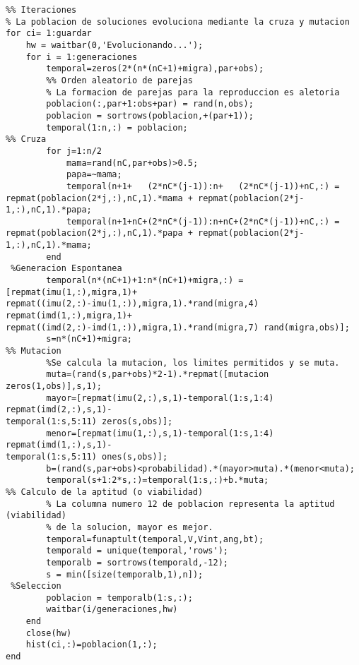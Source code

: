 \begin{verbatim}
%% Iteraciones
% La poblacion de soluciones evoluciona mediante la cruza y mutacion
for ci= 1:guardar
    hw = waitbar(0,'Evolucionando...');
    for i = 1:generaciones
        temporal=zeros(2*(n*(nC+1)+migra),par+obs);
        %% Orden aleatorio de parejas
        % La formacion de parejas para la reproduccion es aletoria
        poblacion(:,par+1:obs+par) = rand(n,obs);
        poblacion = sortrows(poblacion,+(par+1));
        temporal(1:n,:) = poblacion;
%% Cruza
        for j=1:n/2
            mama=rand(nC,par+obs)>0.5;
            papa=~mama;
            temporal(n+1+   (2*nC*(j-1)):n+   (2*nC*(j-1))+nC,:) =
repmat(poblacion(2*j,:),nC,1).*mama + repmat(poblacion(2*j-1,:),nC,1).*papa;
            temporal(n+1+nC+(2*nC*(j-1)):n+nC+(2*nC*(j-1))+nC,:) =
repmat(poblacion(2*j,:),nC,1).*papa + repmat(poblacion(2*j-1,:),nC,1).*mama;
        end
 %Generacion Espontanea
        temporal(n*(nC+1)+1:n*(nC+1)+migra,:) = [repmat(imu(1,:),migra,1)+
repmat((imu(2,:)-imu(1,:)),migra,1).*rand(migra,4) repmat(imd(1,:),migra,1)+
repmat((imd(2,:)-imd(1,:)),migra,1).*rand(migra,7) rand(migra,obs)];
        s=n*(nC+1)+migra;
%% Mutacion
        %Se calcula la mutacion, los limites permitidos y se muta. 
        muta=(rand(s,par+obs)*2-1).*repmat([mutacion zeros(1,obs)],s,1);
        mayor=[repmat(imu(2,:),s,1)-temporal(1:s,1:4) repmat(imd(2,:),s,1)-
temporal(1:s,5:11) zeros(s,obs)];
        menor=[repmat(imu(1,:),s,1)-temporal(1:s,1:4) repmat(imd(1,:),s,1)-
temporal(1:s,5:11) ones(s,obs)];
        b=(rand(s,par+obs)<probabilidad).*(mayor>muta).*(menor<muta);
        temporal(s+1:2*s,:)=temporal(1:s,:)+b.*muta;
%% Calculo de la aptitud (o viabilidad)
        % La columna numero 12 de poblacion representa la aptitud (viabilidad) 
        % de la solucion, mayor es mejor.
        temporal=funaptult(temporal,V,Vint,ang,bt);
        temporald = unique(temporal,'rows');
        temporalb = sortrows(temporald,-12);
        s = min([size(temporalb,1),n]);
 %Seleccion
        poblacion = temporalb(1:s,:);
        waitbar(i/generaciones,hw)
    end
    close(hw)
    hist(ci,:)=poblacion(1,:);
end

\end{verbatim}


